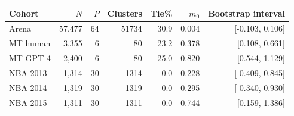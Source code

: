 \begin{tabular}{lrrrrrr}
\toprule
Cohort & $N$ & $P$ & Clusters & Tie\% & $m_0$ & Bootstrap interval \\
\midrule
Arena & 57,477 & 64 & 51734 & 30.9 & 0.004 & [-0.103, 0.106] \\
MT human & 3,355 & 6 & 80 & 23.2 & 0.378 & [0.108, 0.661] \\
MT GPT-4 & 2,400 & 6 & 80 & 25.0 & 0.820 & [0.544, 1.129] \\
NBA 2013 & 1,314 & 30 & 1314 & 0.0 & 0.228 & [-0.409, 0.845] \\
NBA 2014 & 1,319 & 30 & 1319 & 0.0 & 0.295 & [-0.340, 0.930] \\
NBA 2015 & 1,311 & 30 & 1311 & 0.0 & 0.744 & [0.159, 1.386] \\
\bottomrule
\end{tabular}
